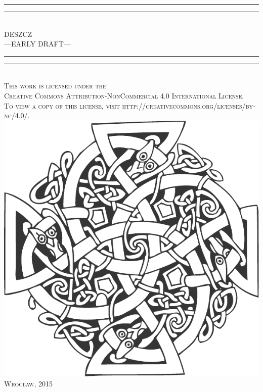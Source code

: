 \documentclass[9pt,openany,titlepage]{extbook}
\begin{document}
	\begin{titlepage}
		\centering
		\vspace*{\baselineskip}
		\rule{\textwidth}{1.6pt}\vspace*{-\baselineskip}\vspace*{2pt}
		\rule{\textwidth}{0.4pt}\\[\baselineskip]{
			\LARGE DESZCZ \\[0.3\baselineskip] ---EARLY DRAFT---
		}\\[0.2\baselineskip]
		\rule{\textwidth}{0.4pt}\vspace*{-\baselineskip}\vspace{3.2pt}
		\rule{\textwidth}{1.6pt}\\[\baselineskip]
		\scshape 
		This work is licensed under the\\
		Creative Commons Attribution-NonCommercial 4.0 International License.\\
		To view a copy of this license, visit http://creativecommons.org/licenses/by-nc/4.0/. \\[\baselineskip] 
		\vspace*{4\baselineskip}
		\includegraphics[height=0.5\textheight]{ornament.pdf} 
		\vfill{\scshape Wrocław, 2015} \\[0.3\baselineskip]
	\end{titlepage}
	\thispagestyle{empty}
	\cleardoublepage
\end{document}
